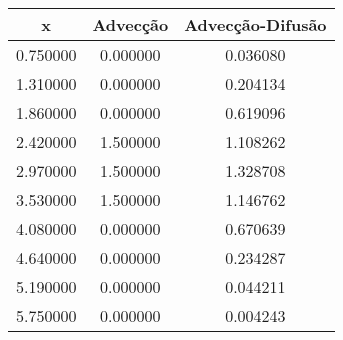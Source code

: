\begin{tabular}{ccc}
\toprule
x & Advecção & Advecção-Difusão \\
\midrule
0.750000 & 0.000000 & 0.036080 \\
1.310000 & 0.000000 & 0.204134 \\
1.860000 & 0.000000 & 0.619096 \\
2.420000 & 1.500000 & 1.108262 \\
2.970000 & 1.500000 & 1.328708 \\
3.530000 & 1.500000 & 1.146762 \\
4.080000 & 0.000000 & 0.670639 \\
4.640000 & 0.000000 & 0.234287 \\
5.190000 & 0.000000 & 0.044211 \\
5.750000 & 0.000000 & 0.004243 \\
\bottomrule
\end{tabular}
